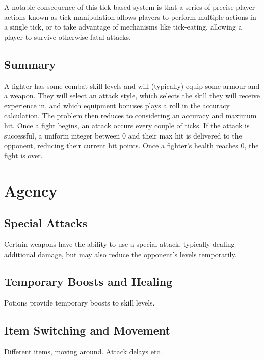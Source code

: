 		A notable consequence of this tick-based system is that a series of precise player actions known as tick-manipulation allows players to perform multiple actions in a single tick, or to take advantage of mechanisms like tick-eating, allowing a player to survive otherwise fatal attacks.

	\subsection{Summary}
		A fighter has some combat skill levels and will (typically) equip some armour and a weapon. They will select an attack style, which selects the skill they will receive experience in, and which equipment bonuses plays a roll in the accuracy calculation. The problem then reduces to considering an accuracy and maximum hit. Once a fight begins, an attack occurs every couple of ticks. If the attack is successful, a uniform integer between 0 and their max hit is delivered to the opponent, reducing their current hit points. Once a fighter's health reaches 0, the fight is over.


\section{Agency}
	\subsection{Special Attacks}
		Certain weapons have the ability to use a special attack, typically dealing additional damage, but may also reduce the opponent's levels temporarily.

	\subsection{Temporary Boosts and Healing}
		Potions provide temporary boosts to skill levels.

	\subsection{Item Switching and Movement}
		Different items, moving around. Attack delays etc.
